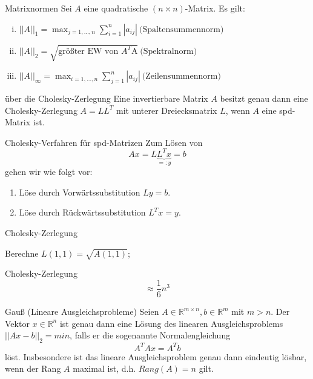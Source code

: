 \begin{flashcard}[Satz]{Matrixnormen}
Sei $A$ eine quadratische $(n \times n)$-Matrix. Es gilt:
\begin{enumerate}[(i)]
	\item $\displaystyle ||A||_1 = \max_{j=1,\ldots,n} \sum_{i=1}^n |a_{ij}| \ \text{(Spaltensummennorm)}$
	\item $\displaystyle ||A||_2 = \sqrt{\text{größter EW von $A^T$A}} \ \text{(Spektralnorm)}$
	\item $\displaystyle ||A||_\infty = \max_{i=1,\ldots,n} \sum_{j=1}^n |a_{ij}| \ \text{(Zeilensummennorm)}$
\end{enumerate}
\end{flashcard}

\begin{flashcard}[Satz]{über die Cholesky-Zerlegung}
Eine invertierbare Matrix $A$ besitzt genau dann eine Cholesky-Zerlegung $A = LL^T$ mit unterer Dreiecksmatrix $L$, wenn $A$ eine spd-Matrix ist.
\end{flashcard}

\begin{flashcard}[Algorithmus]{Cholesky-Verfahren für spd-Matrizen}
Zum Lösen von
$$Ax = L \underbrace{L^T x}_{=:y} = b$$
gehen wir wie folgt vor:
\begin{enumerate}
	\item Löse durch Vorwärtssubstitution $Ly = b$.
	\item Löse durch Rückwärtssubstitution $L^Tx = y$.
\end{enumerate}
\end{flashcard}

\begin{flashcard}[Algorithmus]{Cholesky-Zerlegung}
\begin{algorithm}[H]
	Berechne $L(1,1) = \sqrt{A(1,1)}$;\\
\end{algorithm}
\end{flashcard}

\begin{flashcard}[Aufwand]{Cholesky-Zerlegung}
	$$ \approx \frac{1}{6} n^3$$
\end{flashcard}

\begin{flashcard}[Satz]{Gauß (Lineare Ausgleichsprobleme)}
Seien $A \in \mathbb{R}^{m \times n}, b \in \mathbb{R}^m$ mit $m > n$. Der Vektor $x \in \mathbb{R}^n$ ist genau dann eine Lösung des linearen Ausgleichsproblems $||Ax -b||_2 = min$, falls er die sogenannte Normalengleichung
$$A^TAx = A^Tb$$
löst. Insbesondere ist das lineare Ausgleichsproblem genau dann eindeutig lösbar, wenn der Rang $A$ maximal ist, d.h. $Rang(A) = n$ gilt.
\end{flashcard}

